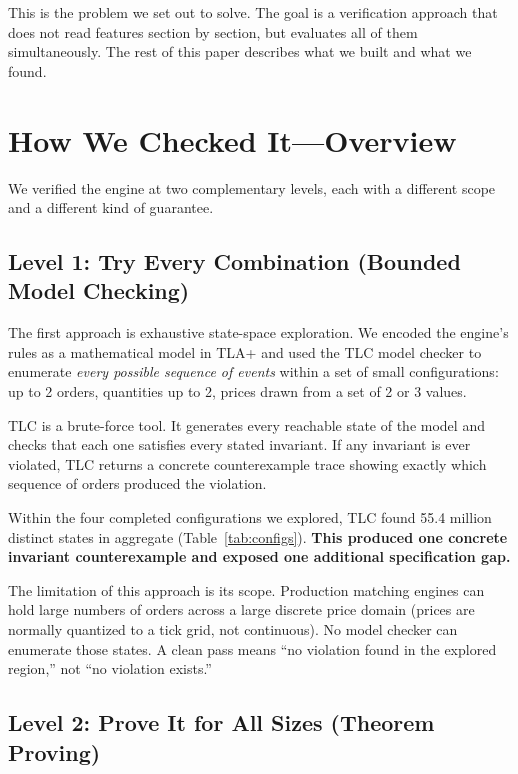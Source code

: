 \documentclass[11pt,a4paper]{article}
\begin{document}
This is the problem we set out to solve. The goal is a verification
approach that does not read features section by section, but evaluates
all of them simultaneously. The rest of this paper describes what we
built and what we found.


\section{How We Checked It---Overview}
\label{sec:overview}

We verified the engine at two complementary levels, each with a
different scope and a different kind of guarantee.

\subsection{Level 1: Try Every Combination (Bounded Model Checking)}
\label{sec:overview-tlc}

The first approach is exhaustive state-space exploration. We encoded
the engine's rules as a mathematical model in TLA+ and used the TLC
model checker to enumerate \emph{every possible sequence of events}
within a set of small configurations: up to 2 orders, quantities up to
2, prices drawn from a set of 2 or 3 values.

TLC is a brute-force tool. It generates every reachable state of the
model and checks that each one satisfies every stated invariant. If any
invariant is ever violated, TLC returns a concrete counterexample trace
showing exactly which sequence of orders produced the violation.

Within the four completed configurations we explored, TLC found 55.4
million distinct states in aggregate (Table~\ref{tab:configs}).
\textbf{This produced one concrete invariant counterexample and exposed
one additional specification gap.}

The limitation of this approach is its scope. Production matching
engines can hold large numbers of orders across a large discrete price
domain (prices are normally quantized to a tick grid, not continuous).
No model checker can enumerate those states. A clean pass means ``no
violation found in the explored region,'' not ``no violation exists.''

\subsection{Level 2: Prove It for All Sizes (Theorem Proving)}
\label{sec:overview-lean}
\end{document}
